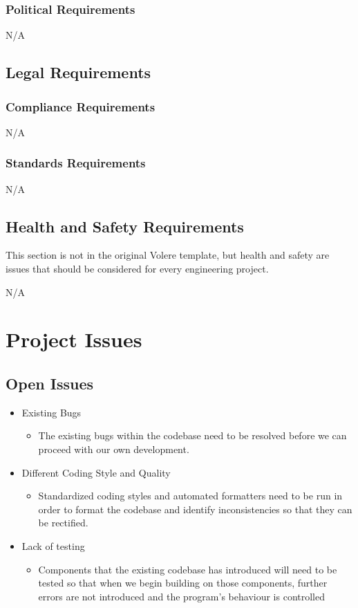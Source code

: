 \documentclass[12pt, titlepage]{article}
\begin{document}
\subsubsection{Political Requirements}

N/A

\subsection{Legal Requirements}

\subsubsection{Compliance Requirements}

N/A

\subsubsection{Standards Requirements}

N/A

\subsection{Health and Safety Requirements}

This section is not in the original Volere template, but health and safety are
issues that should be considered for every engineering project.

\noindent N/A 

\section{Project Issues}

\subsection{Open Issues}

\begin{itemize}
\item Existing Bugs
	\begin{itemize}
	\item The existing bugs within the codebase need to be resolved before we can proceed with our own development.
	\end{itemize}
\item Different Coding Style and Quality
	\begin{itemize}
	\item Standardized coding styles and automated formatters need to be run in order to format the codebase and identify inconsistencies so that they can be rectified.
	\end{itemize}
\item Lack of testing
	\begin{itemize}
	\item Components that the existing codebase has introduced will need to be tested so that when we begin building on those components, further errors are not introduced and the program’s behaviour is controlled
	\end{itemize}
\end{itemize}
\end{document}
